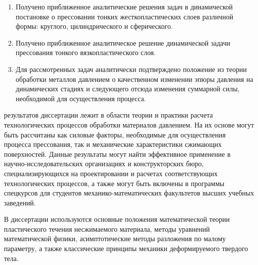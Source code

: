 {\novelty}
\begin{enumerate}[beginpenalty=10000] %
    \item Получено приближенное аналитические решения задач в динамической постановке о прессовании тонких жесткопластических слоев различной формы: круглого, цилиндрического и сферического.
    \item Получено приближенное аналитическое решение динамической задачи прессования тонкого вязкопластического слоя.
    \item Для рассмотренных задач аналитически подтверждено положение из теории обработки металлов давлением о качественном изменении эпюры давления на динамических стадиях и следующего отсюда изменения суммарной силы, необходимой для осуществления процесса.
\end{enumerate}

{\influence} результатов диссертации лежит в области теории и практики расчета технологических процессов обработки материалов давлением. На их основе могут быть рассчитаны как силовые факторы, необходимые для осуществления процесса прессования, так и механические характеристики  сжимающих поверхностей. Данные результаты могут найти эффективное применение в научно-исследовательских организациях и конструкторских бюро, специализирующихся на проектировании и расчетах соответствующих технологических процессов, а также могут быть включены в программы спецкурсов для студентов механико-математических факультетов высших учебных заведений.

{\methods} В диссертации используются основные положения математической теории пластического течения несжимаемого материала, методы уравнений математической физики, асимптотические методы разложения по малому параметру, а также классические принципы механики деформируемого твердого тела.

